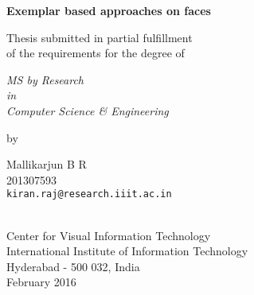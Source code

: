 \thispagestyle{empty}
\begin{center}
\vspace*{1.5cm}
{\Large \bf Exemplar based approaches on faces}

\vspace*{3.75cm}
{\large Thesis submitted in partial fulfillment\\}
{\large  of the requirements for the degree of \\}

\vspace*{1cm}
{\it {\large MS by Research} \\
{\large in\\}
{\large Computer Science \& Engineering \\}}

\vspace*{1cm}
{\large by}

\vspace*{5mm}
{\large Mallikarjun B R\\}
{\large 201307593\\
{\small \tt kiran.raj@research.iiit.ac.in}}


\vspace*{4.0cm}
{\\}
{\large Center for Visual Information Technology \\}
{\large International Institute of Information Technology\\}
{\large Hyderabad - 500 032, India\\}
{\large February 2016\\}
\end{center}
